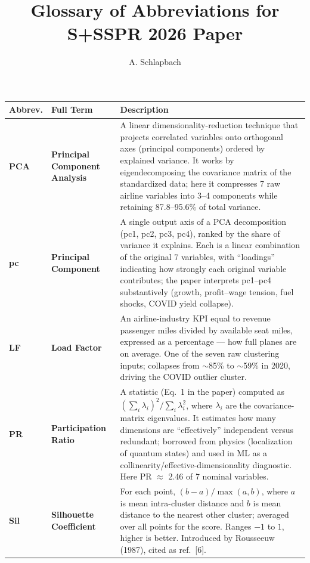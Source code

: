 \documentclass[11pt]{article}
\title{Glossary of Abbreviations for S+SSPR 2026 Paper}
\author{A. Schlapbach}
\date{}
\newcommand{\glossaryhighlight}[1]{\textbf{\boldmath#1}}
\begin{document}
\maketitle

\begin{longtable}{P{2cm} P{3cm} P{11cm}}
\toprule
\glossaryhighlight{\textbf{Abbrev.}} & \glossaryhighlight{\textbf{Full Term}} & \textbf{Description} \\
\midrule
\endhead

\glossaryhighlight{PCA} & \glossaryhighlight{Principal Component Analysis} &
A linear dimensionality-reduction technique that projects correlated variables onto orthogonal axes (principal components) ordered by explained variance. It works by eigendecomposing the covariance matrix of the standardized data; here it compresses 7 raw airline variables into 3--4 components while retaining 87.8--95.6\% of total variance. \\

\glossaryhighlight{pc} & \glossaryhighlight{Principal Component} &
A single output axis of a PCA decomposition (pc1, pc2, pc3, pc4), ranked by the share of variance it explains. Each is a linear combination of the original 7 variables, with ``loadings'' indicating how strongly each original variable contributes; the paper interprets pc1--pc4 substantively (growth, profit--wage tension, fuel shocks, COVID yield collapse). \\

\glossaryhighlight{LF} & \glossaryhighlight{Load Factor} &
An airline-industry KPI equal to revenue passenger miles divided by available seat miles, expressed as a percentage --- how full planes are on average. One of the seven raw clustering inputs; collapses from $\sim$85\% to $\sim$59\% in 2020, driving the COVID outlier cluster. \\

\glossaryhighlight{PR} & \glossaryhighlight{Participation Ratio} &
A statistic (Eq.~1 in the paper) computed as $(\sum_i \lambda_i)^2 / \sum_i \lambda_i^2$, where $\lambda_i$ are the covariance-matrix eigenvalues. It estimates how many dimensions are ``effectively'' independent versus redundant; borrowed from physics (localization of quantum states) and used in ML as a collinearity/effective-dimensionality diagnostic. Here PR $\approx$ 2.46 of 7 nominal variables. \\

\glossaryhighlight{Sil} & \glossaryhighlight{Silhouette Coefficient} &
For each point, $(b - a)/\max(a,b)$, where $a$ is mean intra-cluster distance and $b$ is mean distance to the nearest other cluster; averaged over all points for the score. Ranges $-1$ to $1$, higher is better. Introduced by Rousseeuw (1987), cited as ref.~[6]. \\


\end{longtable}
\end{document}
